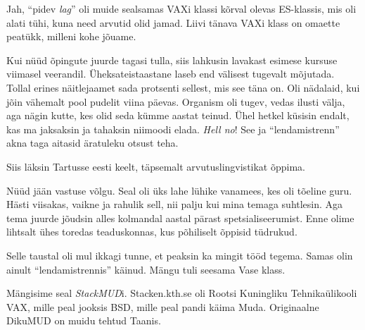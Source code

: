 
Jah, \enquote{pidev \emph{lag}} oli muide sealsamas VAXi klassi kõrval olevas 
ES-klassis, mis oli alati tühi, kuna need arvutid olid jamad. Liivi tänava 
VAXi klass on omaette peatükk, milleni kohe jõuame.\label{sisu:jaanus:vask}

Kui nüüd õpingute juurde tagasi tulla, siis lahkusin lavakast esimese kursuse viimasel veerandil. Üheksateistaastane laseb end
välisest tugevalt mõjutada. Tollal erines
näitlejaamet sada protsenti sellest, mis see täna on. 
Oli nädalaid, kui jõin vähemalt pool pudelit viina päevas. 
Organism oli tugev, vedas ilusti välja, aga nägin kutte, kes olid 
seda kümme aastat teinud. Ühel hetkel küsisin endalt, kas ma jaksaksin 
ja tahaksin niimoodi elada. \emph{Hell no}! See ja \enquote{lendamistrenn} akna taga aitasid äratuleku otsust teha. 

Siis läksin Tartusse eesti keelt, täpsemalt 
arvutuslingvistikat õppima.


Nüüd jään vastuse võlgu. Seal oli üks lahe lühike vanamees, kes 
oli tõeline guru. Hästi viisakas, vaikne ja rahulik sell, nii palju kui 
mina temaga suhtlesin. Aga tema juurde jõudsin alles kolmandal aastal pärast 
spetsialiseerumist. Enne olime lihtsalt ühes toredas teaduskonnas, kus 
põhiliselt õppisid tüdrukud.

Selle taustal oli mul ikkagi tunne, et peaksin ka mingit tööd tegema. Samas olin
ainult \enquote{lendamistrennis} käinud. Mängu tuli seesama Vase klass.

Mängisime seal \emph{StackMUD}i. Stacken.kth.se oli Rootsi 
Kuningliku Tehnikaülikooli 
VAX, mille peal 
jooksis BSD, mille peal pandi käima Muda. 
Originaalne DikuMUD on muidu tehtud Taanis.


